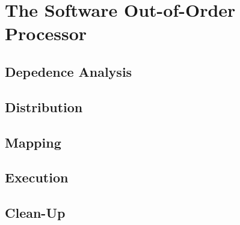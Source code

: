 \section{The Software Out-of-Order Processor}
\label{sec:soop}



\subsection{Depedence Analysis}


\subsection{Distribution}


\subsection{Mapping}


\subsection{Execution}


\subsection{Clean-Up}


